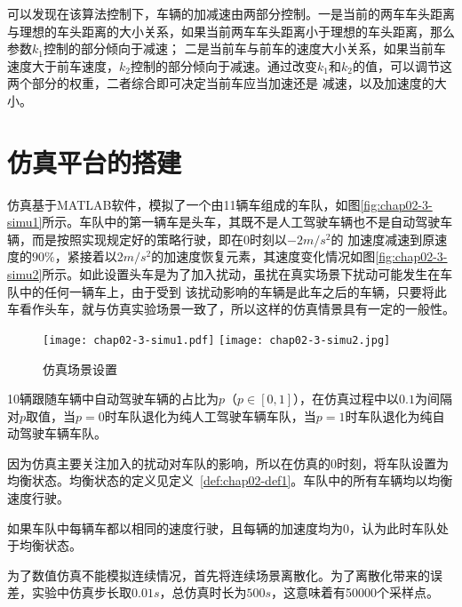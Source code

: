 可以发现在该算法控制下，车辆的加减速由两部分控制。一是当前的两车车头距离与理想的车头距离的大小关系，如果当前两车车头距离小于理想的车头距离，那么参数$k_1$控制的部分倾向于减速；
二是当前车与前车的速度大小关系，如果当前车速度大于前车速度，$k_2$控制的部分倾向于减速。通过改变$k_1$和$k_2$的值，可以调节这两个部分的权重，二者综合即可决定当前车应当加速还是
减速，以及加速度的大小。


\section{仿真平台的搭建}
\label{sec:simulation-platform}

仿真基于MATLAB软件，模拟了一个由11辆车组成的车队，如图\ref{fig:chap02-3-simu1}所示。车队中的第一辆车是头车，其既不是人工驾驶车辆也不是自动驾驶车辆，而是按照实现规定好的策略行驶，即在0时刻以$-2m/s^2$的
加速度减速到原速度的$90\%$，紧接着以$2m/s^2$的加速度恢复元素，其速度变化情况如图\ref{fig:chap02-3-simu2}所示。如此设置头车是为了加入扰动，虽扰在真实场景下扰动可能发生在车队中的任何一辆车上，由于受到
该扰动影响的车辆是此车之后的车辆，只要将此车看作头车，就与仿真实验场景一致了，所以这样的仿真情景具有一定的一般性。

\begin{figure}
  \centering
    {\texttt{[image: chap02-3-simu1.pdf]}}
    {\texttt{[image: chap02-3-simu2.jpg]}}
  \caption{仿真场景设置}
  \label{fig:chap02-2-simu}
\end{figure}

10辆跟随车辆中自动驾驶车辆的占比为$p$（$p \in [0, 1]$），在仿真过程中以$0.1$为间隔对$p$取值，当$p=0$时车队退化为纯人工驾驶车辆车队，当$p=1$时车队退化为纯自动驾驶车辆车队。

因为仿真主要关注加入的扰动对车队的影响，所以在仿真的0时刻，将车队设置为均衡状态。均衡状态的定义见定义~\ref{def:chap02-def1}。车队中的所有车辆均以均衡速度行驶。

\begin{definition}[车队的均衡状态]
  如果车队中每辆车都以相同的速度行驶，且每辆的加速度均为0，认为此时车队处于均衡状态。
  \label{def:chap02-def1}
\end{definition}

为了数值仿真不能模拟连续情况，首先将连续场景离散化。为了离散化带来的误差，实验中仿真步长取$0.01s$，总仿真时长为$500s$，这意味着有50000个采样点。

